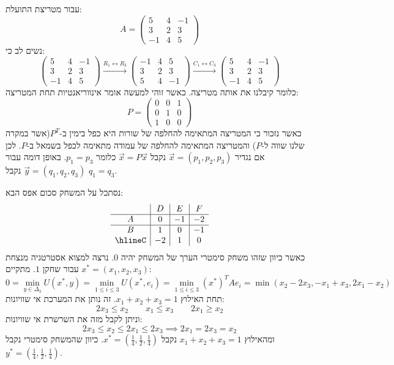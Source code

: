 \documentclass{tstextbook}
\begin{document}
\begin{example}
עבור מטריצת התועלת:
$$A=\begin{pmatrix}5 & 4 & -1 \\3 & 2 & 3 \\-1 & 4 & 5
\end{pmatrix}$$
נשים לב כי:
$$\begin{pmatrix}5 & 4 & -1 \\3 & 2 & 3 \\-1 & 4 & 5\end{pmatrix}\xrightarrow{R_{1}\leftrightarrow  R_{3}}\begin{pmatrix}-1 & 4 & 5 \\3 & 2 & 3 \\5 & 4 & -1\end{pmatrix}\xrightarrow{C_{1}\leftrightarrow  C_{3}}\begin{pmatrix}5 & 4 & -1 \\3 & 2 & 3 \\-1 & 4 & 5
\end{pmatrix}$$
כלומר קיבלנו את אותה מטריצה. כאשר זוהי למעשה אומר אינווריאנטיות תחת המטריצה:
$$P=\begin{pmatrix}0 & 0 & 1 \\0 & 1 & 0 \\1 & 0 & 0
\end{pmatrix}$$
כאשר נזכור כי המטריצה המתאימה להחלפה של שורות היא כפל בימין ב-\(P^{T}\)(אשר במקרה שלנו שווה ל-\(P\)) והמטריצה המתאימה להחלפה של עמודה מתאימה לכפל בשמאל ב-\(P\). לכן אם נגדיר \(\vec{x}=(p_{1},p_{2},p_{3})\) נקבל \(\vec{x}=P\vec{x}\) כלומר \(p_{1}=p_{3}\). באופן דומה עבור \(\vec{y}=(q_{1},q_{2},q_{3})\) נקבל \(q_{1}=q_{3}\).

\end{example}
\begin{example}
נסתכל על המשחק סכום אפס הבא:
$$\begin{array}{c|c|c|c} & D & E & F  \\ \hline A & 0 & -1 & -2 \\ \hline B & 1 & 0 & -1  \\ \hlineC & -2 & 1 & 0 
\end{array}$$
כאשר כיוון שזהו משחק סימטרי הערך של המשחק יהיה 0. נרצה למצוא אסטרטגיה מנצחת \(x^{*}=(x_{1},x_{2},x_{3})\) עבור שחקן \(1\). מתקיים:
$$0=\operatorname*{min}_{y\in\Delta_{3}}U(x^{*},y)=\operatorname*{min}_{1\leq i\leq3}U(x^{*},e_{i})=\operatorname*{min}_{1\leq i\leq3}(x^{*})^{T}A e_{i}=\operatorname*{min}(x_{2}-2x_{3},-x_{1}+x_{3},2x_{1}-x_{2})$$
תחת האילוץ \(x_{1}+x_{2}+x_{3}=1\). זה נותן את המערכת אי שוויונות:
$$2x_{3}\leq x_{2}\qquad x_{1}\leq x_{3}\qquad 2x_{1}\geq x_{2}$$
וניתן לקבל מזה את השרשרת אי שוויונות:
$$2x_{3}\leq x_{2}\leq {2}x_{1}\leq {2}x_{3}\implies 2x_{1}=2x_{3}=x_{2}$$
ומהאילוץ \(x_{1}+x_{2}+x_{3}=1\) נקבל \(x^{*}=\left( \frac{1}{4},\frac{1}{2},\frac{1}{4} \right)\). כיוון שהמשחק סימטרי נקבל \(y^{*}=\left( \frac{1}{4},\frac{1}{2},\frac{1}{4} \right)\).

\end{example}
\end{document}
